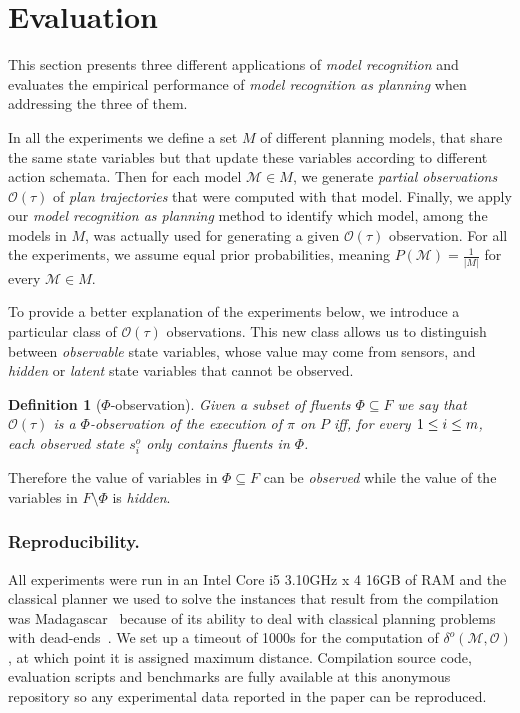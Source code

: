 \documentclass[letterpaper]{article} %
\newtheorem{definition}[theorem]{Definition}
\begin{document}
\section{Evaluation}
\label{sec:evaluation}

This section presents three different applications of {\em model recognition} and evaluates the empirical performance of {\em model recognition as planning} when addressing the three of them.

In all the experiments we define a set $M$ of different planning models, that share the same state variables but that update these variables according to different action schemata. Then for each model $\mathcal{M}\in M$, we generate {\em partial observations} $\mathcal{O}(\tau)$ of {\em plan trajectories} that were computed with that model. Finally, we apply our {\em model recognition as planning} method to identify which model, among the models in $M$, was actually used for generating a given $\mathcal{O}(\tau)$ observation. For all the experiments, we assume equal prior probabilities, meaning $P(\mathcal{M}) = \frac{1}{|M|}$ for every $\mathcal{M} \in M$. 

To provide a better explanation of the experiments below, we introduce a particular class of $\mathcal{O}(\tau)$ observations. This new class allows us to distinguish between {\em observable} state variables, whose value may come from sensors, and {\em hidden} or {\em latent} state variables that cannot be observed.
\begin{definition}[$\Phi$-observation]
Given a subset of fluents $\Phi\subseteq F$ we say that $\mathcal{O}(\tau)$ is a $\Phi$-observation of the execution of $\pi$ on $P$ iff, for every ${\small 1\leq i\leq m}$, each observed state $s_i^o$ only contains fluents in $\Phi$.
\end{definition}
Therefore the value of variables in $\Phi\subseteq F$ can be {\em observed} while the value of the variables in $F\setminus\Phi$ is {\em hidden}. 

\subsubsection{Reproducibility.} All experiments were run in an Intel Core i5 3.10GHz x 4 16GB of RAM and the classical planner we used to solve the instances that result from the compilation was {\sc Madagascar}~\cite{rintanen2014madagascar} because of its ability to deal with classical planning problems with dead-ends~\cite{lopez2015deterministic}. We set up a timeout of 1000s for the computation of $\delta^o(\mathcal{M},\mathcal{O})$, at which point it is assigned maximum distance. Compilation source code, evaluation scripts and benchmarks are fully available at this anonymous repository {\em } so any experimental data reported in the paper can be reproduced.
\end{document}
